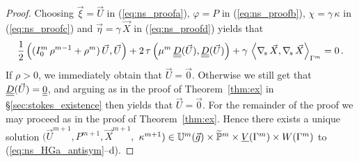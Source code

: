 \begin{proof}
Choosing $\vec\xi=\vec U$ in (\ref{eq:ns_proofa}), $\varphi =  P$ in
(\ref{eq:ns_proofb}), $\chi = \gamma\,\kappa$ in (\ref{eq:ns_proofc}) and
$\vec\eta=\gamma\,\vec X$ in (\ref{eq:ns_proofd}) yields that
\begin{equation}
\frac{1}{2}\left((I^m_0\,\rho^{m-1}+\rho^m)\,\vec U, \vec U \right)
+ 2\,\tau\left(\mu^m\,\mat D(\vec U), \mat D(\vec U) \right)
+ \gamma\,\left\langle \nabs\,\vec X, \nabs\,\vec X \right\rangle_{\Gamma^m}
= 0\,. \label{eq:ns_proof2}
\end{equation}
If $\rho > 0$, we immediately obtain that $\vec U = \vec 0$. Otherwise we
still get that $\mat D(\vec U) = \mat 0$, and arguing as in the proof of
Theorem~\ref{thm:ex} in \S\ref{sec:stokes_existence} then yields that
$\vec U = \vec 0$. For the remainder of the proof we may proceed as in the
proof of Theorem~\ref{thm:ex}. Hence there exists a unique solution $(\vec
U^{m+1}, P^{m+1}, \vec X^{m+1},$
$\kappa^{m+1}) \in \mathbb{U}^{m}(\vec{g})\times \widetilde{\mathbb{P}}^m \times \underline{V}(\Gamma^m) \times W(\Gamma^m)$
to (\ref{eq:ns_HGa_antisym}--d).
\end{proof}

